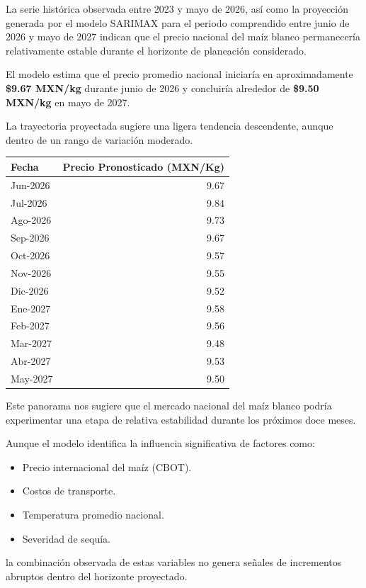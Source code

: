 \documentclass[11pt]{article}
\providecommand{\tightlist}{%
      \setlength{\itemsep}{0pt}\setlength{\parskip}{0pt}}
\begin{document}
La serie histórica observada entre 2023 y mayo de 2026, así como la
proyección generada por el modelo SARIMAX para el periodo comprendido
entre junio de 2026 y mayo de 2027 indican que el precio nacional del
maíz blanco permanecería relativamente estable durante el horizonte de
planeación considerado.

El modelo estima que el precio promedio nacional iniciaría en
aproximadamente \textbf{\$9.67 MXN/kg} durante junio de 2026 y
concluiría alrededor de \textbf{\$9.50 MXN/kg} en mayo de 2027.

La trayectoria proyectada sugiere una ligera tendencia descendente,
aunque dentro de un rango de variación moderado.

\begin{longtable}[]{@{}lr@{}}
\toprule\noalign{}
Fecha & Precio Pronosticado (MXN/Kg) \\
\midrule\noalign{}
\endhead
\bottomrule\noalign{}
\endlastfoot
Jun-2026 & 9.67 \\
Jul-2026 & 9.84 \\
Ago-2026 & 9.73 \\
Sep-2026 & 9.67 \\
Oct-2026 & 9.57 \\
Nov-2026 & 9.55 \\
Dic-2026 & 9.52 \\
Ene-2027 & 9.58 \\
Feb-2027 & 9.56 \\
Mar-2027 & 9.48 \\
Abr-2027 & 9.53 \\
May-2027 & 9.50 \\
\end{longtable}

Este panorama nos sugiere que el mercado nacional del maíz blanco podría
experimentar una etapa de relativa estabilidad durante los próximos doce
meses.

Aunque el modelo identifica la influencia significativa de factores
como:

\begin{itemize}
\tightlist
\item
  Precio internacional del maíz (CBOT).
\item
  Costos de transporte.
\item
  Temperatura promedio nacional.
\item
  Severidad de sequía.
\end{itemize}

la combinación observada de estas variables no genera señales de
incrementos abruptos dentro del horizonte proyectado.
\end{document}
